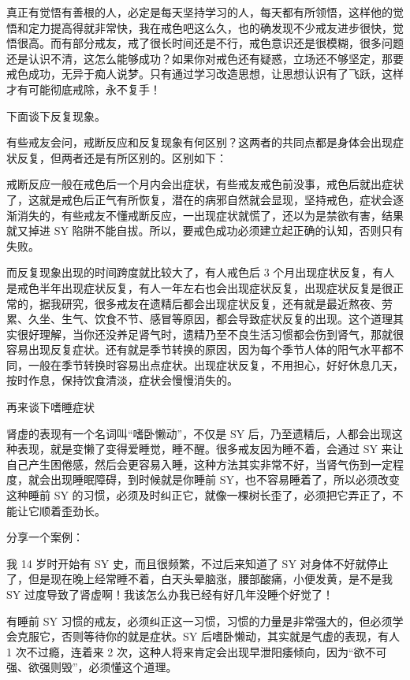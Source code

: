 \documentclass{ctexart}
\begin{document}
真正有觉悟有善根的人，必定是每天坚持学习的人，每天都有所领悟，这样他的觉悟和定力提高得就非常快，我在戒色吧这么久，也的确发现不少戒友进步很快，觉悟很高。而有部分戒友，戒了很长时间还是不行，戒色意识还是很模糊，很多问题还是认识不清，这怎么能够成功？如果你对戒色还有疑惑，立场还不够坚定，那要戒色成功，无异于痴人说梦。只有通过学习改造思想，让思想认识有了飞跃，这样才有可能彻底戒除，永不复手！

下面谈下反复现象。

有些戒友会问，戒断反应和反复现象有何区别？这两者的共同点都是身体会出现症状反复，但两者还是有所区别的。区别如下：

戒断反应一般在戒色后一个月内会出症状，有些戒友戒色前没事，戒色后就出症状了，这就是戒色后正气有所恢复，潜在的病邪自然就会显现，坚持戒色，症状会逐渐消失的，有些戒友不懂戒断反应，一出现症状就慌了，还以为是禁欲有害，结果就又掉进 SY 陷阱不能自拔。所以，要戒色成功必须建立起正确的认知，否则只有失败。

而反复现象出现的时间跨度就比较大了，有人戒色后 3 个月出现症状反复，有人是戒色半年出现症状反复，有人一年左右也会出现症状反复，出现症状反复是很正常的，据我研究，很多戒友在遗精后都会出现症状反复，还有就是最近熬夜、劳累、久坐、生气、饮食不节、感冒等原因，都会导致症状反复的出现。这个道理其实很好理解，当你还没养足肾气时，遗精乃至不良生活习惯都会伤到肾气，那就很容易出现反复症状。还有就是季节转换的原因，因为每个季节人体的阳气水平都不同，一般在季节转换时容易出点症状。出现症状反复，不用担心，好好休息几天，按时作息，保持饮食清淡，症状会慢慢消失的。

再来谈下嗜睡症状

肾虚的表现有一个名词叫“嗜卧懒动”，不仅是 SY 后，乃至遗精后，人都会出现这种表现，就是变懒了变得爱睡觉，睡不醒。很多戒友因为睡不着，会通过 SY 来让自己产生困倦感，然后会更容易入睡，这种方法其实非常不好，当肾气伤到一定程度，就会出现睡眠障碍，到时候就是你睡前 SY，也不容易睡着了，所以必须改变这种睡前 SY 的习惯，必须及时纠正它，就像一棵树长歪了，必须把它弄正了，不能让它顺着歪劲长。

分享一个案例：

我 14 岁时开始有 SY 史，而且很频繁，不过后来知道了 SY 对身体不好就停止了，但是现在晚上经常睡不着，白天头晕脑涨，腰部酸痛，小便发黄，是不是我 SY 过度导致了肾虚啊！我该怎么办我已经有好几年没睡个好觉了！

有睡前 SY 习惯的戒友，必须纠正这一习惯，习惯的力量是非常强大的，但必须学会克服它，否则等待你的就是症状。SY 后嗜卧懒动，其实就是气虚的表现，有人 1 次不过瘾，连着来 2 次，这种人将来肯定会出现早泄阳痿倾向，因为“欲不可强、欲强则毁”，必须懂这个道理。
\end{document}
